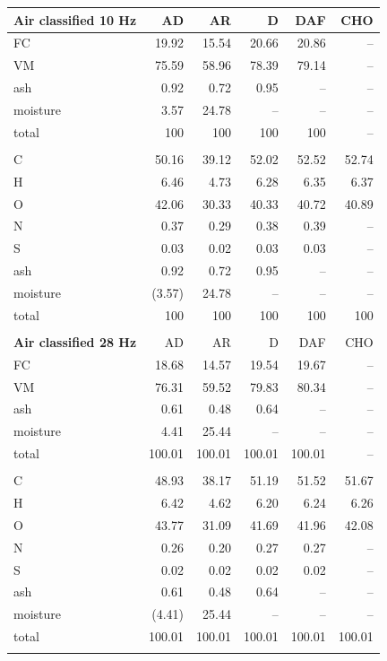 \begin{longtable}{lrrrrr}
    \textbf{Air classified 10 Hz} & AD & AR & D & DAF & CHO \\
    \midrule
    FC       & 19.92  & 15.54  & 20.66  & 20.86  & -- \\
    VM       & 75.59  & 58.96  & 78.39  & 79.14  & -- \\
    ash      & 0.92   & 0.72   & 0.95   & --     & -- \\
    moisture & 3.57   & 24.78  & --     & --     & -- \\
    total    & 100    & 100    & 100    & 100    & -- \\
    \\
    C        & 50.16  & 39.12  & 52.02  & 52.52  & 52.74 \\
    H        & 6.46   & 4.73   & 6.28   & 6.35   & 6.37 \\
    O        & 42.06  & 30.33  & 40.33  & 40.72  & 40.89 \\
    N        & 0.37   & 0.29   & 0.38   & 0.39   & -- \\
    S        & 0.03   & 0.02   & 0.03   & 0.03   & -- \\
    ash      & 0.92   & 0.72   & 0.95   & --     & -- \\
    moisture & (3.57) & 24.78  & --     & --     & -- \\
    total    & 100    & 100    & 100    & 100    & 100 \\
    \\

    \textbf{Air classified 28 Hz} & AD & AR & D & DAF & CHO \\
    \midrule
    FC       & 18.68  & 14.57  & 19.54  & 19.67  & -- \\
    VM       & 76.31  & 59.52  & 79.83  & 80.34  & -- \\
    ash      & 0.61   & 0.48   & 0.64   & --     & -- \\
    moisture & 4.41   & 25.44  & --     & --     & -- \\
    total    & 100.01 & 100.01 & 100.01 & 100.01 & -- \\
    \\
    C        & 48.93  & 38.17  & 51.19  & 51.52  & 51.67 \\
    H        & 6.42   & 4.62   & 6.20   & 6.24   & 6.26 \\
    O        & 43.77  & 31.09  & 41.69  & 41.96  & 42.08 \\
    N        & 0.26   & 0.20   & 0.27   & 0.27   & -- \\
    S        & 0.02   & 0.02   & 0.02   & 0.02   & -- \\
    ash      & 0.61   & 0.48   & 0.64   & --     & -- \\
    moisture & (4.41) & 25.44  & --     & --     & -- \\
    total    & 100.01 & 100.01 & 100.01 & 100.01 & 100.01 \\
    \\


\end{longtable}
